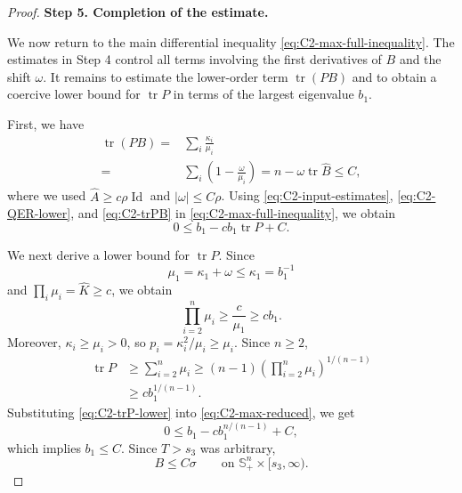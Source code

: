 \documentclass[11pt, reqno]{amsart}
\theoremstyle{remark}
\theoremstyle{definition}
\numberwithin{equation}{section}
\DeclareMathOperator{\tr}{tr}
\newcommand{\Id}{\operatorname{Id}}
\begin{document}
\begin{proof}
\medskip
\noindent\textbf{Step 5. Completion of the estimate.}

We now return to the main differential inequality \eqref{eq:C2-max-full-inequality}. The estimates in
Step 4 control all terms involving the first derivatives of $B$ and
the shift $\omega$. It remains to estimate the lower-order term
$\tr(PB)$ and to obtain a coercive lower bound for $\tr P$ in terms
of the largest eigenvalue $b_1$.

First, we have
\begin{equation}\label{eq:C2-trPB}
\begin{aligned}
        \tr(PB)
        =&\sum_i\frac{\kappa_i}{\mu_i}\\
          =&\sum_i\left(1-\frac{\omega}{\mu_i}\right)
          =n-\omega\tr\widehat B
          \le C,
\end{aligned}
\end{equation}
where we used 
$\widehat A\ge c\rho\Id$ and $|\omega|\le C\rho$.
Using \eqref{eq:C2-input-estimates}, \eqref{eq:C2-QER-lower}, and
\eqref{eq:C2-trPB} in \eqref{eq:C2-max-full-inequality}, we obtain
\begin{equation}\label{eq:C2-max-reduced}
        0\le b_1-cb_1\tr P+C.
\end{equation}

We next derive a lower bound for $\tr P$.  Since
\begin{equation*}
        \mu_1=\kappa_1+\omega\le\kappa_1=b_1^{-1}
\end{equation*}
and $\prod_i\mu_i=\widehat K\ge c$, we obtain
\begin{equation*}
        \prod_{i=2}^n\mu_i\ge\frac c{\mu_1}\ge cb_1.
\end{equation*}
Moreover, $\kappa_i\ge\mu_i>0$, so
$p_i=\kappa_i^2/\mu_i\ge\mu_i$.  Since $n\ge2$,
\begin{equation}\label{eq:C2-trP-lower}
\begin{split}
        \tr P
        &\ge\sum_{i=2}^n\mu_i
         \ge(n-1)\left(\prod_{i=2}^n\mu_i\right)^{1/(n-1)}\\
        &\ge c b_1^{1/(n-1)}.
\end{split}
\end{equation}
Substituting \eqref{eq:C2-trP-lower} into \eqref{eq:C2-max-reduced}, we get
\begin{equation*}
        0\le b_1-cb_1^{n/(n-1)}+C,
\end{equation*}
which implies $b_1\le C$.  Since $T>s_3$ was arbitrary,
\begin{equation}\label{eq:C2-B-upper}
        B\le C\sigma
        \qquad\text{on }\mathbb{S}^n_+\times[s_3,\infty).
\end{equation}


\end{proof}
\end{document}
